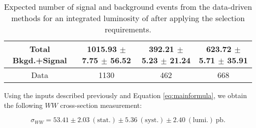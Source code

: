 \begin{table}[ht!]
\begin{center}
\begin{tabular} {|c|c|c|c|}
Total Bkgd.+Signal    & 1015.93 $\pm$ 7.75 $\pm$ 56.52   & 392.21 $\pm$ 5.23 $\pm$ 21.24   & 623.72 $\pm$ 5.71 $\pm$ 35.91 \\ \hline \hline
Data                  & 1130                             & 462                             & 668 \\ \hline
\end{tabular}
  \caption{Expected number of signal and background events from the data-driven methods for
  an integrated luminosity of \intlumi after applying the selection requirements.}
   \label{tab:data_yields}
  \end{center}
\end{table}

Using the inputs described previously and Equation \ref{eq:mainformula},
we obtain the following $WW$ cross-section measurement:

\begin{equation*}
\sigma_{WW}  = 53.41 \pm 2.03~\mathrm{(stat.)} \pm 5.36~\mathrm{(syst.)} \pm 2.40~\mathrm{(lumi.)~pb}.
\end{equation*}

